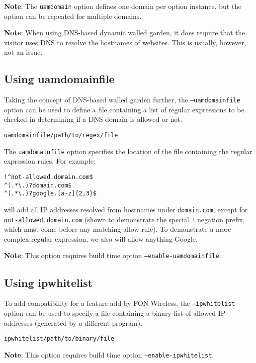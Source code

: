 \textbf{Note}: The \texttt{uamdomain} option defines one domain per
option instance, but the option can be repeated for multiple domains.

\textbf{Note}: When using DNS-based dynamic walled garden, it does
require that the visitor uses DNS to resolve the hostnames of
websites. This is usually, however, not an issue.

\subsection{Using uamdomainfile}

Taking the concept of DNS-based walled garden further, the
\texttt{--uamdomainfile} option can be used to define a file
containing a list of regular expressions to be checked in determining
if a DNS domain is allowed or not.

\begin{alltt}\small
uamdomainfile /path/to/regex/file
\end{alltt}

The \texttt{uamdomainfile} option specifies the location of the file
containing the regular expression rules. For example:

{\small%
\begin{verbatim}
!^not-allowed.domain.com$
^(.*\.)?domain.com$
^(.*\.)?google.[a-z]{2,3}$
\end{verbatim}%
}

will add all IP addresses resolved from hostnames under
\texttt{domain.com}, except for \texttt{not-allowed.domain.com} (shown
to demonstrate the special \texttt{!} negation prefix, which must come
before any matching allow rule). To demonstrate a more complex regular
expression, we also will allow anything Google.

\textbf{Note}: This option requires build time option
\texttt{--enable-uamdomainfile}.

\subsection{Using ipwhitelist}

To add compatibility for a feature add by FON Wireless, the
\texttt{--ipwhitelist} option can be used to specify a file containing
a binary list of allowed IP addresses (generated by a different
program).

\begin{alltt}\small
ipwhitelist /path/to/binary/file
\end{alltt}

\textbf{Note}: This option requires build time option
\texttt{--enable-ipwhitelist}.
